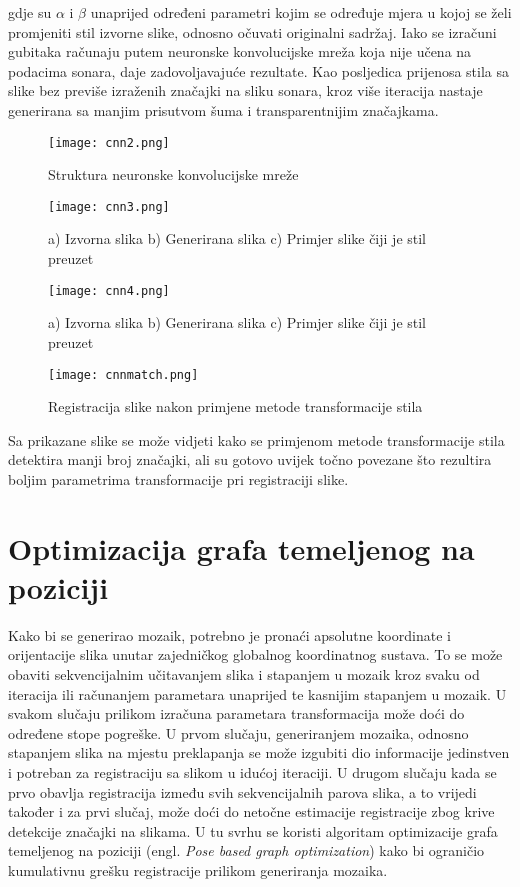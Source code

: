 \documentclass[times, utf8, diplomski]{fer}
\begin{document}
gdje su $\alpha$ i $\beta$ unaprijed određeni parametri kojim se određuje mjera u kojoj se želi promjeniti stil izvorne slike, odnosno očuvati originalni sadržaj. Iako se izračuni gubitaka računaju putem neuronske konvolucijske mreža koja nije učena na podacima sonara, daje zadovoljavajuće rezultate. Kao posljedica prijenosa stila sa slike bez previše izraženih značajki na sliku sonara, kroz više iteracija nastaje generirana sa manjim prisutvom šuma i transparentnijim značajkama. 

\begin{figure}[tbh]
\centering
\texttt{[image: cnn2.png]}
		\caption{Struktura neuronske konvolucijske mreže }
		\label{fig:Uspješna registracija dviju akustičnih slika FLS-a}
\end{figure}
\newpage
\begin{figure}[tbh]
\centering
\texttt{[image: cnn3.png]}
		\caption{a) Izvorna slika b) Generirana slika c) Primjer slike čiji je stil preuzet}
		\label{fig:Uspješna registracija dviju akustičnih slika FLS-a}
\end{figure}
\begin{figure}[tbh]
\centering
\texttt{[image: cnn4.png]}
		\caption{a) Izvorna slika b) Generirana slika c) Primjer slike čiji je stil preuzet}
		\label{fig:Uspješna registracija dviju akustičnih slika FLS-a}
\end{figure}
\begin{figure}[!tbh]
\centering
\texttt{[image: cnnmatch.png]}
		\caption{ Registracija slike nakon primjene metode transformacije stila}
		\label{fig:Uspješna registracija dviju akustičnih slika FLS-a}
\end{figure}
Sa prikazane slike se može vidjeti kako se primjenom metode transformacije stila detektira manji broj značajki, ali su gotovo uvijek točno povezane što rezultira boljim parametrima transformacije pri registraciji slike.

\chapter{Optimizacija grafa temeljenog na poziciji}
Kako bi se generirao mozaik, potrebno je pronaći apsolutne koordinate i orijentacije slika unutar zajedničkog globalnog koordinatnog sustava. To se može obaviti sekvencijalnim učitavanjem slika i stapanjem u mozaik kroz svaku od iteracija ili računanjem parametara unaprijed te kasnijim stapanjem u mozaik. U svakom slučaju prilikom izračuna parametara transformacija može doći do određene stope pogreške. U prvom slučaju, generiranjem mozaika, odnosno stapanjem slika na mjestu preklapanja se može izgubiti dio informacije jedinstven i potreban za registraciju sa slikom u idućoj iteraciji. U drugom slučaju kada se prvo obavlja registracija između svih sekvencijalnih parova slika, a to vrijedi također i za prvi slučaj, može doći do netočne estimacije registracije zbog krive detekcije značajki na slikama. U tu svrhu se koristi algoritam optimizacije grafa temeljenog na poziciji  (engl. \textit{Pose based graph optimization}) kako bi ograničio kumulativnu grešku registracije prilikom generiranja mozaika.
\end{document}

